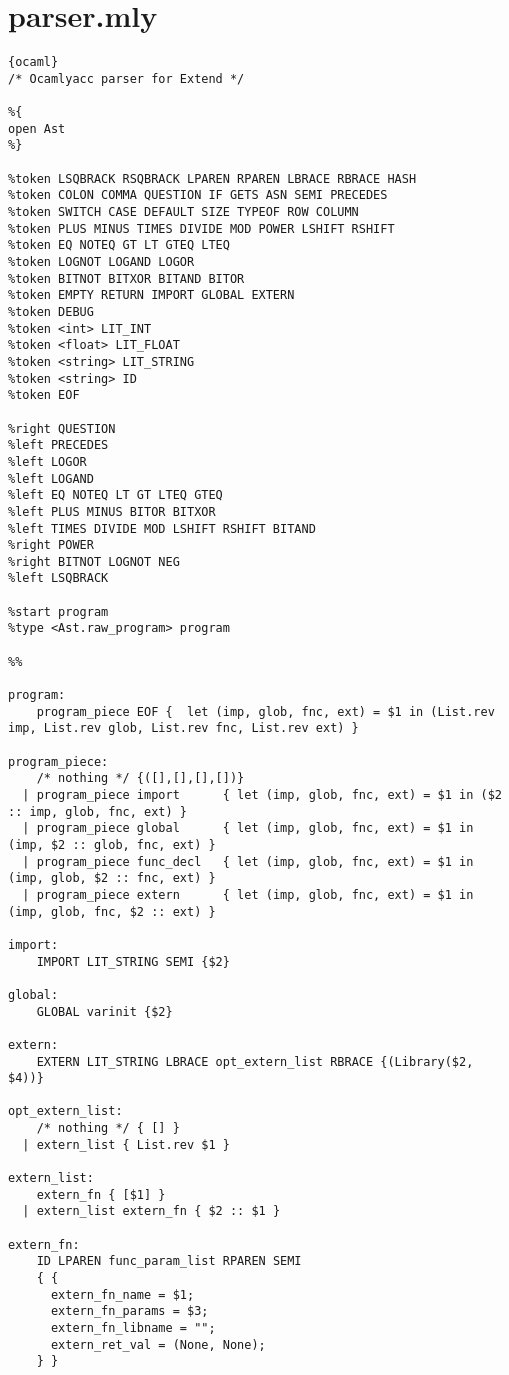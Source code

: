 \section{parser.mly}
\begin{lstlisting}{ocaml}
/* Ocamlyacc parser for Extend */

%{
open Ast
%}

%token LSQBRACK RSQBRACK LPAREN RPAREN LBRACE RBRACE HASH
%token COLON COMMA QUESTION IF GETS ASN SEMI PRECEDES
%token SWITCH CASE DEFAULT SIZE TYPEOF ROW COLUMN
%token PLUS MINUS TIMES DIVIDE MOD POWER LSHIFT RSHIFT
%token EQ NOTEQ GT LT GTEQ LTEQ
%token LOGNOT LOGAND LOGOR
%token BITNOT BITXOR BITAND BITOR
%token EMPTY RETURN IMPORT GLOBAL EXTERN
%token DEBUG
%token <int> LIT_INT
%token <float> LIT_FLOAT
%token <string> LIT_STRING
%token <string> ID
%token EOF

%right QUESTION
%left PRECEDES
%left LOGOR
%left LOGAND
%left EQ NOTEQ LT GT LTEQ GTEQ
%left PLUS MINUS BITOR BITXOR
%left TIMES DIVIDE MOD LSHIFT RSHIFT BITAND
%right POWER
%right BITNOT LOGNOT NEG
%left LSQBRACK

%start program
%type <Ast.raw_program> program

%%

program:
    program_piece EOF {  let (imp, glob, fnc, ext) = $1 in (List.rev imp, List.rev glob, List.rev fnc, List.rev ext) }

program_piece:
    /* nothing */ {([],[],[],[])}
  | program_piece import      { let (imp, glob, fnc, ext) = $1 in ($2 :: imp, glob, fnc, ext) }
  | program_piece global      { let (imp, glob, fnc, ext) = $1 in (imp, $2 :: glob, fnc, ext) }
  | program_piece func_decl   { let (imp, glob, fnc, ext) = $1 in (imp, glob, $2 :: fnc, ext) }
  | program_piece extern      { let (imp, glob, fnc, ext) = $1 in (imp, glob, fnc, $2 :: ext) }

import:
    IMPORT LIT_STRING SEMI {$2}

global:
    GLOBAL varinit {$2}

extern:
    EXTERN LIT_STRING LBRACE opt_extern_list RBRACE {(Library($2, $4))}

opt_extern_list:
    /* nothing */ { [] }
  | extern_list { List.rev $1 }

extern_list:
    extern_fn { [$1] }
  | extern_list extern_fn { $2 :: $1 }

extern_fn:
    ID LPAREN func_param_list RPAREN SEMI
    { {
      extern_fn_name = $1;
      extern_fn_params = $3;
      extern_fn_libname = "";
      extern_ret_val = (None, None);
    } }


\end{lstlisting}
